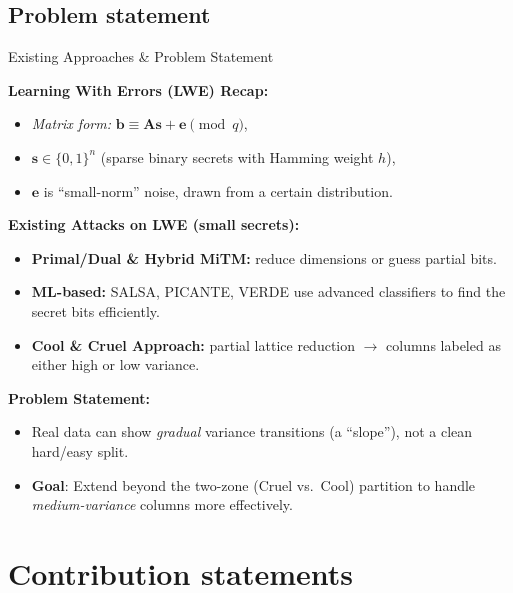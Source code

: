 \documentclass{beamer}
\begin{document}
\subsection*{Problem statement}
\begin{frame}{Existing Approaches \& Problem Statement}
  
  \textbf{Learning With Errors (LWE) Recap:}
  \begin{itemize}
    \item \emph{Matrix form:} $\mathbf{b} \equiv \mathbf{A}\mathbf{s} + \mathbf{e} \pmod{q}$,
    \item $\mathbf{s} \in \{0,1\}^n$ (sparse binary secrets with Hamming weight $h$),
    \item $\mathbf{e}$ is “small-norm” noise, drawn from a certain distribution.
  \end{itemize}
  
  \textbf{Existing Attacks on LWE (small secrets):}
  \begin{itemize}
    \item \textbf{Primal/Dual \& Hybrid MiTM:} reduce dimensions or guess partial bits.
    \item \textbf{ML-based:} SALSA, PICANTE, VERDE use advanced classifiers to find the secret bits efficiently.
    \item \textbf{Cool \& Cruel Approach:} partial lattice reduction $\rightarrow$ columns labeled as either high or low variance. 
  \end{itemize}
  
  \textbf{Problem Statement:}
  \begin{itemize}
    \item Real data can show \emph{gradual} variance transitions (a “slope”), not a clean hard/easy split.
    \item \textbf{Goal}: Extend beyond the two-zone (Cruel vs.\ Cool) partition to handle \emph{medium-variance} columns more effectively.
  \end{itemize}
  \end{frame}

  \section{Contribution statements}
\end{document}
